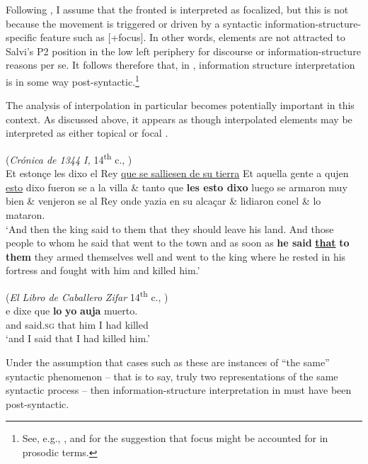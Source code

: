 \documentclass[output=paper]{LSP/langsci}
\begin{document}
\noindent Following \citet{Sitaridou2011}, I assume that the fronted  is interpreted as focalized, but this is not because the movement is triggered or driven by a syntactic information-structure-specific feature such as [+focus].  In other words, elements are not attracted to Salvi’s P2 position in the low left periphery for discourse or information-structure reasons per se.  It follows therefore that, in , information structure interpretation is in some way post-syntactic.\footnote{See, e.g., \citet{Cinque1993}, \citet{Reinhart2006} and \citet{Sheehan2010} for the suggestion that focus might be accounted for in prosodic terms.}  

The analysis of interpolation in particular becomes potentially important in this context.  As discussed above, it appears as though interpolated elements may be interpreted as either topical  or focal .

\begin{exe}
  (\textit{Crónica de 1344 I,} 14\textsuperscript{th} c., \citealt[(19)]{Poole2013})\\
    Et estonçe les dixo el Rey \ul{que se salliesen de su tierra} Et aquella gente a qujen \ul{esto} dixo fueron se a la villa \& tanto que \textbf{les esto dixo} luego se armaron muy bien \& venjeron se al Rey onde yazia en su alcaçar \& lidiaron conel \& lo mataron. \\
    \glt ‘And then the king said to them that they should leave his land.  And those people to whom he said that went to the town and as soon as \textbf{he said} \textbf{\ul{that}} \textbf{to them} they armed themselves well and went to the king where he rested in his fortress and fought with him and killed him.’
\end{exe}

\begin{exe}
  (\textit{El Libro de Caballero} \textit{Zifar} 14\textsuperscript{th} c., \citealt[(2b)]{Poole2007})\\
    \gll     e dixe que \textbf{lo} \textbf{yo} \textbf{auja} muerto.\\
	 and said.\textsc{sg} that him I had killed\\
    \glt  ‘and I said that I had killed him.’
\end{exe}

\noindent Under the assumption that cases such as these are instances of ``the same'' syntactic phenomenon -- that is to say, truly two representations of the same syntactic process -- then information-structure interpretation in  must have been post-syntactic.  
\end{document}

